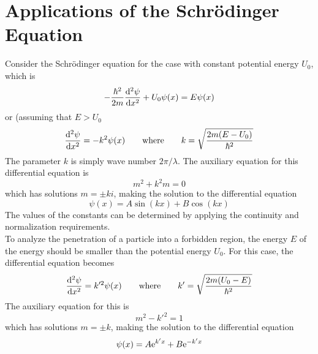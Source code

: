 \documentclass{subfiles}
\begin{document}
	\section{Applications of the Schr\"odinger Equation}
		Consider the Schr\"odinger equation for the case with constant potential energy \(U_0\), which is
			\[-\frac{\hbar^2}{2m}\dv[2]{\psi}{x} + U_0\psi(x) = E\psi(x)\]
			or (assuming that \(E > U_0\)
			\[
				\dv[2]{\psi}{x} = -k^2\psi(x) \qquad \text{where} \qquad
					k = \sqrt{\frac{2m(E - U_0)}{\hbar^2}}
			\]
			The parameter \(k\) is simply wave number \(2\pi/\lambda\). The auxiliary equation for this differential equation is
			\[m^2 + k^2m = 0\]
			which has solutions \(m = \pm ki\), making the solution to the differential equation
			\[\psi(x) = A\sin(kx) + B\cos(kx)\]
			The values of the constants can be determined by applying the continuity and normalization requirements. \\
			To analyze the penetration of a particle into a forbidden region, the energy \(E\) of the energy should be smaller than the potential energy \(U_0\). For this case, the differential equation becomes
			\[
				\dv[2]{\psi}{x} = k'^2\psi(x) \qquad \text{where} \qquad
					k' = \sqrt{\frac{2m(U_0 - E)}{\hbar^2}}
			\]
			The auxiliary equation for this is
			\[m^2 - k'^2 = 1\]
			which has solutions \(m = \pm k\), making the solution to the differential equation
			\[\psi(x) = A\text{e}^{k'x} + B\text{e}^{-k'x}\]
			
\end{document}
